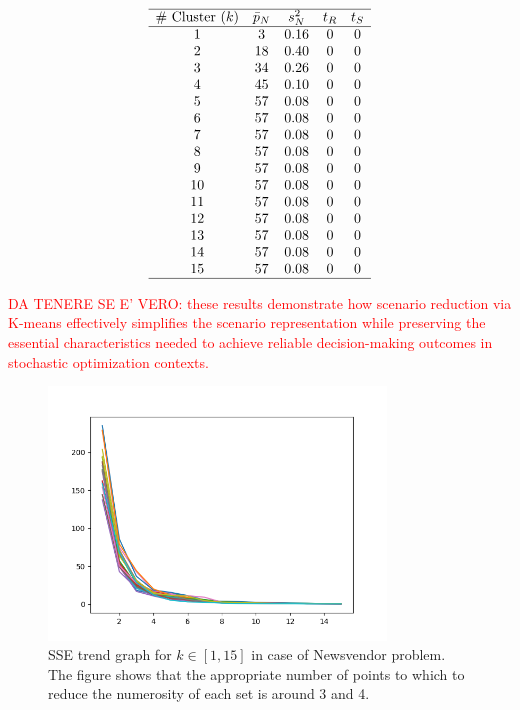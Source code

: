 \documentclass[a4paper,12pt]{article}
\begin{document}
	\[
	\begin{array}{ccccc}
		\hline
		\text{\# Cluster $(k)$} & \text{$\bar{p}_{N}$} & \text{$s_{N}^{2}$} & \text{$t_{R}$} & \text{$t_{S}$}\\
		\hline
		1 & 3 & 0.16 & 0 & 0\\
		2 & 18 & 0.40 & 0 & 0\\
		3 & 34 & 0.26 & 0 & 0\\
		4 & 45 & 0.10 & 0 & 0\\
		5 & 57 & 0.08 & 0 & 0\\
		6 & 57 & 0.08 & 0 & 0\\
		7 & 57 & 0.08 & 0 & 0\\
		8 & 57 & 0.08 & 0 & 0\\
		9 & 57 & 0.08 & 0 & 0\\
		10 & 57 & 0.08 & 0 & 0\\
		11 & 57 & 0.08 & 0 & 0\\
	    12 & 57& 0.08 & 0 & 0\\
		13 & 57 & 0.08 & 0 & 0\\
		14 & 57 & 0.08 & 0 & 0\\
		15 & 57 & 0.08 & 0 & 0\\
		\hline
	\end{array}
	\]
	\label{tab:kmeans-nv-results}
	
	\noindent \textcolor{red}{DA TENERE SE E' VERO: these results demonstrate how scenario reduction via K-means effectively simplifies the scenario representation while preserving the essential characteristics needed to achieve reliable decision-making outcomes in stochastic optimization contexts.}
	\newpage
	\begin{figure}[H]
		\centering
		\includegraphics[width=0.8\textwidth]{../immagini/sseNV.png}
		\caption{SSE trend graph for $k \in [1,15]$ in case of Newsvendor problem. The figure shows that the appropriate number of points to which to reduce the numerosity of each set is around 3 and 4.}
		\label{fig:sse-nv}
	\end{figure}
	
\end{document}
